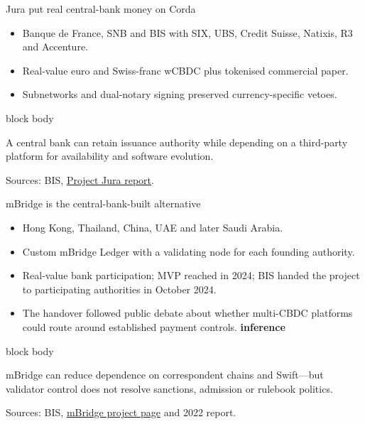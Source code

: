 \documentclass[aspectratio=169,12pt]{beamer}
\newcommand{\source}[1]{\vfill\par\fontsize{5.4}{6.5}\selectfont\color{Quiet}Sources: #1}
\newcommand{\tightitems}{\setlength{\itemsep}{0.42em}\setlength{\parskip}{0pt}}
\newcommand{\tinf}{\textcolor{Ocean}{\bfseries inference}}
\newenvironment{statement}{%
  \begin{beamercolorbox}[sep=.18cm,rounded=false,wd=\linewidth]{block body}%
  \fontsize{13}{15.5}\selectfont\bfseries
}{\end{beamercolorbox}}
\begin{document}
\begin{frame}{Jura put real central-bank money on Corda} %
  \begin{itemize}\tightitems
    \item Banque de France, SNB and BIS with SIX, UBS, Credit Suisse, Natixis, R3 and Accenture.
    \item Real-value euro and Swiss-franc wCBDC plus tokenised commercial paper.
    \item Subnetworks and dual-notary signing preserved currency-specific vetoes.
  \end{itemize}
  \begin{statement}
    A central bank can retain issuance authority while depending on a third-party platform for availability and software evolution.
  \end{statement}
  \source{BIS, \href{https://www.bis.org/publ/othp44.htm}{Project Jura report}.}
\end{frame}

\begin{frame}{mBridge is the central-bank-built alternative}
  \begin{itemize}\tightitems
    \item Hong Kong, Thailand, China, UAE and later Saudi Arabia.
    \item Custom mBridge Ledger with a validating node for each founding authority.
    \item Real-value bank participation; MVP reached in 2024; BIS handed the project to participating authorities in October 2024.
    \item The handover followed public debate about whether multi-CBDC platforms could route around established payment controls. \tinf
  \end{itemize}
  \begin{statement}
    mBridge can reduce dependence on correspondent chains and Swift---but validator control does not resolve sanctions, admission or rulebook politics.
  \end{statement}
  \source{BIS, \href{https://www.bis.org/about/bisih/topics/cbdc/mcbdc_bridge.htm}{mBridge project page} and 2022 report.}
\end{frame}
\end{document}
